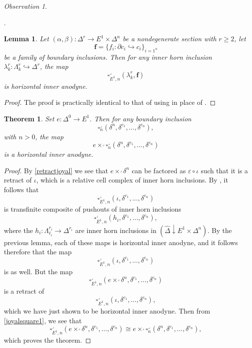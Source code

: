 \documentclass[leqno]{article}
\numberwithin{equation}{subsection}
\theoremstyle{plain}   %
\newtheorem{thm}[equation]{Theorem}
\newtheorem{lemma}[equation]{Lemma}
\theoremstyle{remark}
\newtheorem{obs}[equation]{Observation}
\theoremstyle{plain}
\DeclareMathOperator{\id}{id}
\newcommand{\overcat}[2]{{\left(#1\downarrow #2\right)}}
\newcommand{\psh}[1]{\ensuremath{\widehat{#1}}}
\providecommand{\C}{}
\renewcommand{\C}{\ensuremath{\mathcal{C}}}
\newcommand{\cellset}{\ensuremath{\widehat{\Theta[\mathcal{C}]}}}
\begin{document}
\begin{obs}
\begin{center}
.
	\end{center}
\end{obs}
\begin{lemma}
	Let \((\alpha,\beta): \Delta^r \to E^1\times \Delta^n\) be a nondegenerate section with \(r\geq 2\), let \[\mathbf{f}=\{f_i:\partial c_i \hookrightarrow c_i\}_{i=1^n}\] be a family of boundary inclusions.  Then for any inner horn inclusion \(\lambda^r_k: \Lambda^r_k\hookrightarrow \Delta^r\), the map
	\[
		\square_{E^1,n}^\lrcorner(\lambda^r_k, \mathbf{f})
	\]
	is horizontal inner anodyne.
\end{lemma}
\begin{proof}
	The proof is practically identical to that of  using  in place of .  
\end{proof}
\begin{thm}\label{joyalisothm}
	Set \(e:\Delta^0\to E^1\). Then for any boundary inclusion 
	\[\square_n^\lrcorner(\delta^n,\delta^{c_1},\dots,\delta^{c_n}),\]
	with \(n>0\), the map 
	\[e \times^\lrcorner \square_n^\lrcorner(\delta^n,\delta^{c_1},\dots,\delta^{c_n})\]
	is a horizontal inner anodyne.
\end{thm}
\begin{proof}
	By \ref{retractjoyal} we see that \(e\times^\lrcorner \delta^n\) can be factored as \(\varepsilon\circ \iota\) such that it is a retract of \(\iota\), which is a relative cell complex of inner horn inclusions.  By , it follows that 
	\[
		\square^\lrcorner_{E^1,n}(\iota, \delta^{c_1},\dots,\delta^{c_n})
	\]
	is transfinite composite of pushouts of inner horn inclusions
	\[
		\square^\lrcorner_{E^1,n}(h_i, \delta^{c_1},\dots,\delta^{c_n}),
	\]
	where the \(h_i:\Lambda^{r_i}_{\ell_i}\to \Delta^{r_i}\) are inner horn inclusions in \(\overcat{\psh{\Delta}}{E^1 \times \Delta^n}\).  By the previous lemma, each of these maps is horizontal inner anodyne, and it follows therefore that the map
	\[
		\square^\lrcorner_{E^1,n}(\iota, \delta^{c_1},\dots,\delta^{c_n})
	\]
	is as well.  
	But the map
	\[
		\square^\lrcorner_{E^1,n}(e\times^\lrcorner \delta^n, \delta^{c_1},\dots,\delta^{c_n})
	\]
	is a retract of 
	\[
		\square^\lrcorner_{E^1,n}(\iota, \delta^{c_1},\dots,\delta^{c_n}),
	\]
	which we have just shown to be horizontal inner anodyne. Then from \ref{joyalsquare1}, we see that 
	\[
		\square^\lrcorner_{E^1,n}(e\times^\lrcorner \delta^n, \delta^{c_1},\dots,\delta^{c_n}) \cong e \times^\lrcorner \square^\lrcorner_n(\delta^n,\delta^{c_1},\dots,\delta^{c_n}),
	\]
	which proves the theorem.
\end{proof}
\end{document}
